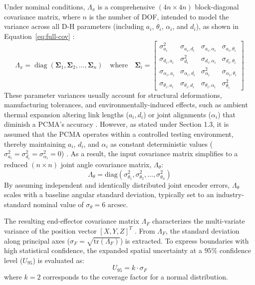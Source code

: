 Under nominal conditions, $\Lambda_x$ is a comprehensive $(4n \times 4n)$ block-diagonal covariance matrix, where $n$ is the number of DOF, intended to model the variance across all D-H parameters (including $a_i$, $\theta_i$, $\alpha_i$, and $d_i$), as shown in Equation~\ref{eq:full-cov} \citep{Hall:2010}:
\begin{equation}
	\label{eq:full-cov}
	\Lambda_x = \operatorname{diag}(\bm{\Sigma}_1, \bm{\Sigma}_2, \dots, \bm{\Sigma}_n) \quad \text{where} \quad \bm{\Sigma}_i = \begin{bmatrix}
		\sigma_{a_i}^2 & \sigma_{a_i, d_i} & \sigma_{a_i, \alpha_i} & \sigma_{a_i, \theta_i} \\
		\sigma_{d_i, a_i} & \sigma_{d_i}^2 & \sigma_{d_i, \alpha_i} & \sigma_{d_i, \theta_i} \\
		\sigma_{\alpha_i, a_i} & \sigma_{\alpha_i, d_i} & \sigma_{\alpha_i}^2 & \sigma_{\alpha_i, \theta_i} \\
		\sigma_{\theta_i, a_i} & \sigma_{\theta_i, d_i} & \sigma_{\theta_i, \alpha_i} & \sigma_{\theta_i}^2
	\end{bmatrix}
\end{equation}
These parameter variances usually account for structural deformations, manufacturing tolerances, and environmentally-induced effects, such as ambient thermal expansion altering link lengths ($a_i, d_i$) or joint alignments ($\alpha_i$) that diminish a PCMA's accuracy \citep{Hall:2010}. However, as stated under Section 1.3, it is assumed that the PCMA operates within a controlled testing environment, thereby maintaining $a_i$, $d_i$, and $\alpha_i$ as constant deterministic values ($\sigma_{a_i}^2 = \sigma_{d_i}^2 = \sigma_{\alpha_i}^2 = 0$) \citep{Hall:2010}. As a result, the input covariance matrix simplifies to a reduced $(n \times n)$ joint angle covariance matrix, $\Lambda_\theta$:
\begin{equation}
	\label{eq:reduced-cov}
	\Lambda_\theta = \text{diag}(\sigma_{\theta_1}^2, \sigma_{\theta_2}^2, \dots, \sigma_{\theta_n}^2)
\end{equation}
By assuming independent and identically distributed joint encoder errors, $\Lambda_\theta$ scales with a baseline angular standard deviation, typically set to an industry-standard nominal value of $\sigma_\theta = 6\text{ arcsec}$.

The resulting end-effector covariance matrix $\Lambda_F$ characterizes the multi-variate variance of the position vector $[X, Y, Z]^T$ \citep{Hall:2010}. From $\Lambda_F$, the standard deviation along principal axes ($\sigma_F = \sqrt{\text{tr}(\Lambda_F)}$) is extracted. To express boundaries with high statistical confidence, the expanded spatial uncertainty at a $95\%$ confidence level ($U_{95}$) is evaluated as:
\begin{equation}
	U_{95} = k \cdot \sigma_F
\end{equation}
where $k = 2$ corresponds to the coverage factor for a normal distribution.

